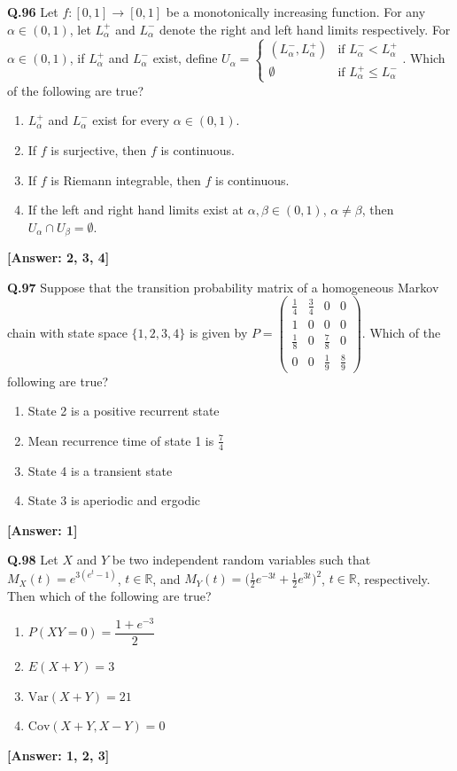 \documentclass[12pt,a4paper]{article}
\newcommand{\ans}[1]{\quad\textcolor{anscolor}{\textbf{[Answer: #1]}}}
\begin{document}
\textbf{Q.96} Let $f:[0,1]\to[0,1]$ be a monotonically increasing function. For any $\alpha\in(0,1)$, let $L_\alpha^+$ and $L_\alpha^-$ denote the right and left hand limits respectively. For $\alpha\in(0,1)$, if $L_\alpha^+$ and $L_\alpha^-$ exist, define $U_\alpha=\begin{cases}(L_\alpha^-,L_\alpha^+)&\text{if }L_\alpha^-<L_\alpha^+\\\emptyset&\text{if }L_\alpha^+\le L_\alpha^-\end{cases}$. Which of the following are true?
\begin{enumerate}[label=\arabic*.]
\item $L_\alpha^+$ and $L_\alpha^-$ exist for every $\alpha\in(0,1)$.
\item If $f$ is surjective, then $f$ is continuous.
\item If $f$ is Riemann integrable, then $f$ is continuous.
\item If the left and right hand limits exist at $\alpha,\beta\in(0,1)$, $\alpha\neq\beta$, then $U_\alpha\cap U_\beta=\emptyset$.
\end{enumerate}\ans{2, 3, 4}

\textbf{Q.97} Suppose that the transition probability matrix of a homogeneous Markov chain with state space $\{1,2,3,4\}$ is given by $P=\begin{pmatrix}\tfrac{1}{4}&\tfrac{3}{4}&0&0\\1&0&0&0\\\tfrac{1}{8}&0&\tfrac{7}{8}&0\\0&0&\tfrac{1}{9}&\tfrac{8}{9}\end{pmatrix}$. Which of the following are true?
\begin{enumerate}[label=\arabic*.]
\item State 2 is a positive recurrent state \item Mean recurrence time of state 1 is $\tfrac{7}{4}$
\item State 4 is a transient state \item State 3 is aperiodic and ergodic
\end{enumerate}\ans{1}

\textbf{Q.98} Let $X$ and $Y$ be two independent random variables such that $M_X(t)=e^{3(e^t-1)}$, $t\in\mathbb{R}$, and $M_Y(t)=\bigl(\tfrac{1}{2}e^{-3t}+\tfrac{1}{2}e^{3t}\bigr)^2$, $t\in\mathbb{R}$, respectively. Then which of the following are true?
\begin{enumerate}[label=\arabic*.]
\item $P(XY=0)=\dfrac{1+e^{-3}}{2}$ \item $E(X+Y)=3$
\item $\text{Var}(X+Y)=21$ \item $\text{Cov}(X+Y,X-Y)=0$
\end{enumerate}\ans{1, 2, 3}
\end{document}
